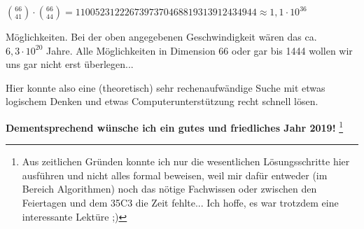 \documentclass{article}
\begin{document}
${66 \choose 41} \cdot {66 \choose 44} = 1100523122267397370468819313912434944 \approx 1,1 \cdot 10^{36}$

Möglichkeiten. Bei der oben angegebenen Geschwindigkeit wären das ca. \\
$6,3 \cdot 10^{20}$ Jahre. Alle Möglichkeiten in Dimension 66 oder gar bis 1444 wollen wir uns gar nicht erst überlegen... 

Hier konnte also eine (theoretisch) sehr rechenaufwändige Suche mit etwas logischem Denken und etwas Computerunterstützung recht schnell lösen. 

\textbf{Dementsprechend wünsche ich ein gutes und friedliches Jahr 2019!} \footnote{Aus zeitlichen Gründen konnte ich nur die wesentlichen Lösungsschritte hier ausführen und nicht alles formal beweisen, weil mir dafür entweder (im Bereich Algorithmen) noch das nötige Fachwissen oder zwischen den Feiertagen und dem 35C3 die Zeit fehlte... Ich hoffe, es war trotzdem eine interessante Lektüre ;)}
\end{document}
